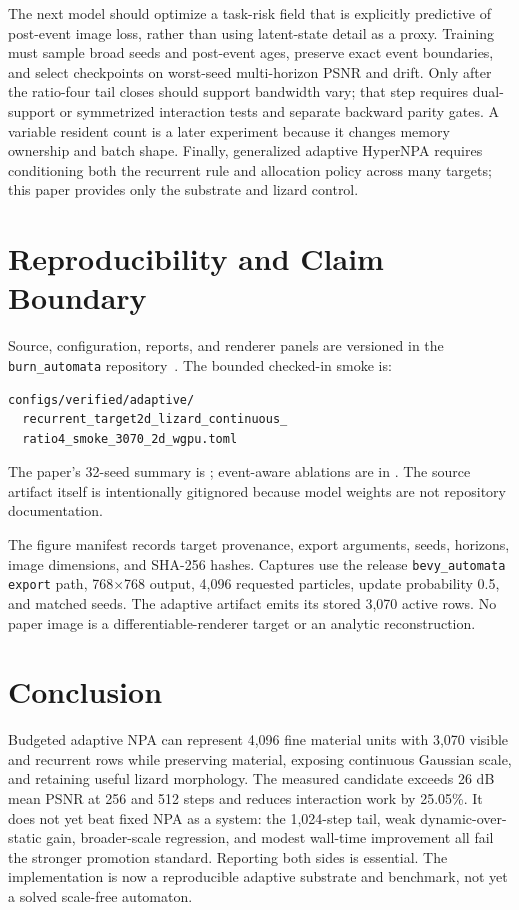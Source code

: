 \documentclass[sigconf,nonacm]{acmart}
\begin{document}
The next model should optimize a task-risk field that is explicitly predictive
of post-event image loss, rather than using latent-state detail as a proxy.
Training must sample broad seeds and post-event ages, preserve exact event
boundaries, and select checkpoints on worst-seed multi-horizon PSNR and drift.
Only after the ratio-four tail closes should support bandwidth vary; that step
requires dual-support or symmetrized interaction tests and separate backward
parity gates. A variable resident count is a later experiment because it
changes memory ownership and batch shape. Finally, generalized adaptive
HyperNPA requires conditioning both the recurrent rule and allocation policy
across many targets; this paper provides only the substrate and lizard control.

\section{Reproducibility and Claim Boundary}

Source, configuration, reports, and renderer panels are versioned in the
\texttt{burn\_automata} repository~\cite{mosure2026burnautomata}. The bounded
checked-in smoke is:
\begin{verbatim}
configs/verified/adaptive/
  recurrent_target2d_lizard_continuous_
  ratio4_smoke_3070_2d_wgpu.toml
\end{verbatim}
The paper's 32-seed summary is
;
event-aware ablations are in
.
The source artifact itself is intentionally gitignored because model weights
are not repository documentation.

The figure manifest records target provenance, export arguments, seeds,
horizons, image dimensions, and SHA-256 hashes. Captures use the release
\texttt{bevy\_automata export} path, 768$\times$768 output, 4,096 requested
particles, update probability 0.5, and matched seeds. The adaptive artifact
emits its stored 3,070 active rows. No paper image is a differentiable-renderer
target or an analytic reconstruction.

\section{Conclusion}

Budgeted adaptive NPA can represent 4,096 fine material units with 3,070
visible and recurrent rows while preserving material, exposing continuous
Gaussian scale, and retaining useful lizard morphology. The measured candidate
exceeds 26 dB mean PSNR at 256 and 512 steps and reduces interaction work by
25.05\%. It does not yet beat fixed NPA as a system: the 1,024-step tail,
weak dynamic-over-static gain, broader-scale regression, and modest wall-time
improvement all fail the stronger promotion standard. Reporting both sides is
essential. The implementation is now a reproducible adaptive substrate and
benchmark, not yet a solved scale-free automaton.



\end{document}
